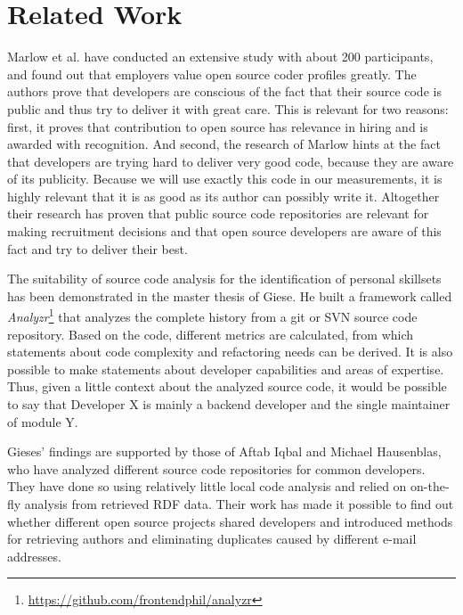 \section{Related Work}
Marlow et al.\cite{md:2013} have conducted an extensive study with about 200 participants, and found out that employers value open source coder profiles greatly.
The authors prove that developers are conscious of the fact that their source code is public and thus try to deliver it with great care. This is relevant for two reasons: first, it proves that contribution to open source has relevance in hiring and is awarded with recognition. And second, the research of Marlow hints at the fact that developers are trying hard to deliver very good code, because they are aware of its publicity. Because we will use exactly this code in our measurements, it is highly relevant that it is as good as its author can possibly write it. Altogether their research has proven that public source code repositories are relevant for making recruitment decisions and that open source developers are aware of this fact and try to deliver their best.
\newline

The suitability of source code analysis for the identification of personal skillsets has been demonstrated in the master thesis of Giese\cite{pg:2014}. He built a framework called \textit{Analyzr}\footnote{\url{https://github.com/frontendphil/analyzr}} that analyzes the complete history from a git or SVN source code repository. Based on the code, different metrics are calculated, from which statements about code complexity and refactoring needs can be derived. It is also possible to make statements about developer capabilities and areas of expertise. Thus, given a little context about the analyzed source code, it would be possible to say that \glqq Developer X is mainly a backend developer and the single maintainer of module Y\grqq.

Gieses' findings are supported by those of Aftab Iqbal and Michael Hausenblas\cite{ih:2012}, who have analyzed different source code repositories for common developers. They have done so using relatively little local code analysis and relied on on-the-fly analysis from retrieved RDF data. Their work has made it possible to find out whether different open source projects shared developers and introduced methods for retrieving authors and eliminating duplicates caused by different e-mail addresses.
\newline

